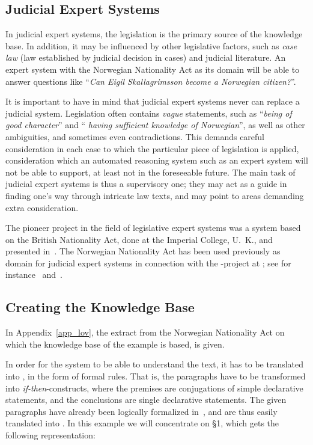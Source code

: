 \subsection{Judicial Expert Systems}

In judicial expert systems, the legislation is the primary source of
the knowledge base. In addition, it may be influenced by other
legislative factors, such as {\em case law\/} (law established by
judicial decision in cases) and judicial literature. An expert system
with the Norwegian Nationality Act as its domain will be able to
answer questions like ``{\em Can Eigil Skallagrimsson become a
Norwegian citizen?\/}''.

It is important to have in mind that judicial expert systems never can
replace a judicial system. Legislation often contains {\em vague\/}
statements, such as ``{\em being of good character\/}'' and ``{\em
having sufficient knowledge of Norwegian\/}'', as well as other
ambiguities, and sometimes even contradictions. This demands careful
consideration in each case to which the particular piece of
legislation is applied, consideration which an automated reasoning
system such as an expert system will not be able to support, at least
not in the foreseeable future. The main task of judicial expert
systems is thus a supervisory one; they may act as a guide in finding
one's way through intricate law texts, and may point to areas
demanding extra consideration.

The pioneer project in the field of legislative expert systems was a
system based on the British Nationality Act, done at the Imperial
College, U.\ K., and presented in~\cite{british}. The Norwegian
Nationality Act has been used previously as domain for judicial
expert systems in connection with the {\hsql}-project at {\nit};
see for instance~\cite{foredrag} and~\cite{maehle}.

\subsection{Creating the Knowledge Base}

In Appendix~\ref{app_lov}, the extract from the Norwegian Nationality
Act on which the knowledge base of the example is based, is given.

In order for the system to be able to understand the text, it has to
be translated into {\nal}, in the form of formal rules. That is, the
paragraphs have to be transformed into {\em if-then\/}-constructs,
where the premises are conjugations of simple declarative statements,
and the conclusions are single declarative statements. The given
paragraphs have already been logically formalized in~\cite{eggen}, and
are thus easily translated into {\nal}. In this example we will
concentrate on \S 1, which gets the following representation:

